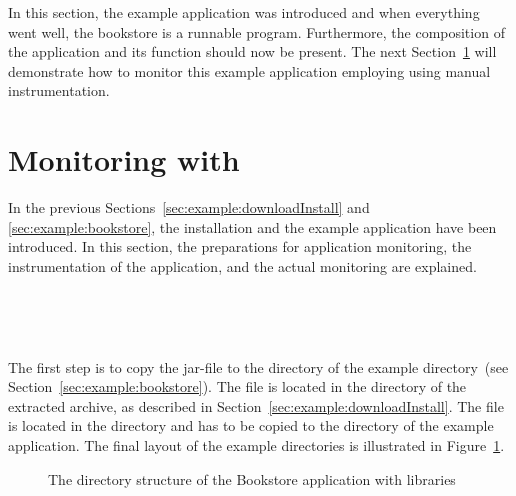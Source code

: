 

\noindent In this section, the \Kieker{} example application was introduced and when everything went well, the bookstore is a runnable program. Furthermore, the composition of the application and its function should now be present. %
The next Section~\ref{sec:example:monitoring} will demonstrate how %
to monitor this example application employing \KiekerMonitoringPart{} using manual instrumentation.

\pagebreak

\section{Monitoring with \KiekerMonitoringPart{}}\label{sec:example:monitoring}

In the previous Sections~\ref{sec:example:downloadInstall} and \ref{sec:example:bookstore}, the \Kieker{} installation and the example application have been introduced. In this section, the preparations for application monitoring, the instrumentation of the application, and the actual monitoring are explained.

\quad\


\

\noindent The first step is to copy the \Kieker{} jar-file \file{\mainJar} to the  directory of the example directory~(see Section~\ref{sec:example:bookstore}). The file is located in the  directory of the extracted \Kieker{} archive, as described in Section~\ref{sec:example:downloadInstall}. %
The file \file{\commonsLoggingJar} is located in the  directory and has to be copied to the  directory of the example application. The final layout of the example directories is illustrated in Figure~\ref{fig:KiekerBookstoreExample}.

\begin{figure}[H]
\begin{graybox}
\end{graybox}
\caption{The directory structure of the Bookstore application with \Kieker{} libraries}
\label{fig:KiekerBookstoreExample}
\end{figure}

